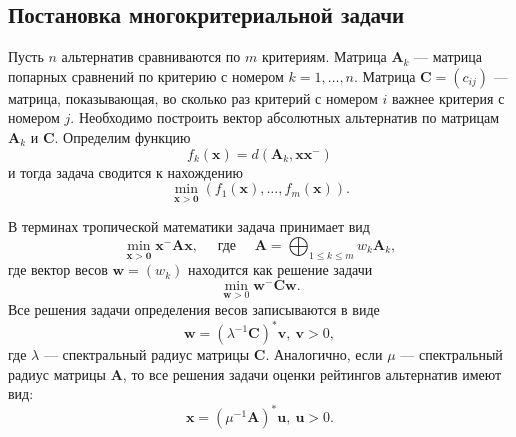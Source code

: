 \documentclass[specialist,
	substylefile = spbu_report.rtx,
	subf,href,colorlinks=true, 12pt]{disser}
\begin{document}
\subsection{Постановка многокритериальной задачи}

Пусть $n$ альтернатив сравниваются по $m$ критериям.
Матрица $\boldsymbol{A}_k$ --- матрица попарных сравнений по критерию с номером $k = 1, \dots, n$.
Матрица $\boldsymbol{C} = (c_{ij})$ --- матрица, показывающая, во сколько раз критерий с номером $i$ важнее критерия с номером $j$. Необходимо построить вектор абсолютных альтернатив по матрицам $\boldsymbol{A}_k$ и $\boldsymbol{C}$.
Определим функцию
$$
	f_{k}(\boldsymbol{x})=d\left(\boldsymbol{A}_{k}, \boldsymbol{x} \boldsymbol{x}^{-}\right)
$$ и тогда задача сводится к нахождению
$$
	\min _{\boldsymbol{x}>\mathbf{0}}\left(f_{1}(\boldsymbol{x}), \ldots, f_{m}(\boldsymbol{x})\right).
$$

В терминах тропической математики задача принимает вид
$$
	\min _{\boldsymbol{x}>\mathbf{0}} \boldsymbol{x}^{-} \boldsymbol{A} \boldsymbol{x}, \quad \text { где } \quad \boldsymbol{A}=\bigoplus_{1 \leq k \leq m} w_{k} \boldsymbol{A}_{k},
$$
где вектор весов $\boldsymbol{w}=\left(w_{k}\right)$ находится как решение задачи
\[
	\min _{\boldsymbol{w}>0} \boldsymbol{w}^{-} \boldsymbol{C} \boldsymbol{w}.
\]
Все решения задачи определения весов записываются в виде
\[
	\boldsymbol{w} = (\lambda^{-1}\boldsymbol{C})^*\boldsymbol{v}, ~\boldsymbol{v} > 0,
\]
где $\lambda$ --- спектральный радиус матрицы $\boldsymbol{C}$. Аналогично, если $\mu$ --- спектральный радиус матрицы $\boldsymbol{A}$, то все решения задачи оценки рейтингов альтернатив имеют вид:
\[
	\boldsymbol{x} = (\mu^{-1}\boldsymbol{A})^*\boldsymbol{u},~\boldsymbol{u} > 0.
\]
\end{document}
